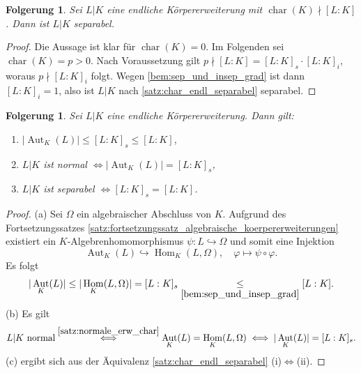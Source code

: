 \documentclass[a4paper, twoside, 11pt, ngerman]{report}
\DeclareMathOperator{\Aut}{Aut}
\DeclareMathOperator{\charact}{char}
\DeclareMathOperator{\Hom}{Hom}
\theoremstyle{definistyle}
\newtheorem{folgerung}[satz]{Folgerung}
\theoremstyle{remark}
\begin{document}
\begin{folgerung}\label{folg:charakteristik_separabel}
Sei $L|K$ eine endliche Körpererweiterung mit $\charact(K) \nmid [L : K]$. Dann ist $L|K$ separabel.
\end{folgerung}
\begin{proof}
Die Aussage ist klar für $\charact(K)=0$. Im Folgenden sei $\charact(K)=p>0$.
Nach Voraussetzung gilt $p \nmid [L : K] = [L : K]_s \cdot [L : K]_i$, woraus $p \nmid [L : K]_i$ folgt.
Wegen \ref{bem:sep_und_insep_grad} ist dann $[L : K]_i = 1$, also ist $L|K$ nach \ref{satz:char_endl_separabel} separabel.
\end{proof}

\begin{folgerung}\label{folg:automorphismen_endlicher_erweiterungen}
Sei $L|K$ eine endliche Körpererweiterung. Dann gilt:
\begin{enumerate}
    \item[(a)] $| \Aut_K(L) | \leq [L : K]_s \leq [L : K]$,
    \item[(b)] $L|K$ ist normal $\iff |\Aut_K(L)| = [L : K]_s$,
    \item[(c)] $L|K$ ist separabel $\iff [L : K]_s = [L : K]$.
\end{enumerate}
\end{folgerung}
\begin{proof}
(a) Sei $\Omega$ ein algebraischer Abschluss von $K$. Aufgrund des Fortsetzungssatzes \ref{satz:fortsetzungssatz_algebraische_koerpererweiterungen} existiert ein $K$-Algebrenhomomorphismus
$\psi\colon L\hookrightarrow\Omega$ und somit eine Injektion
\[
\Aut_K(L) \hookrightarrow \Hom_K(L, \Omega), \quad \varphi\mapsto \psi\circ\varphi.
\]
Es folgt
\[
|\Aut_K(L)| \leq |\Hom_K(L, \Omega)| = [L : K]_s \underset{\ref{bem:sep_und_insep_grad}}{\leq} [L : K].
\]
(b) Es gilt
\[
L|K \text{ normal} \overset{\ref{satz:normale_erw_char}}{\iff} \Aut_K(L) = \Hom_K(L, \Omega) \iff |\Aut_K(L)| = [L : K]_s.
\]    
(c) ergibt sich aus der Äquivalenz \ref{satz:char_endl_separabel} (i)$\Leftrightarrow$(ii).
\end{proof}
\end{document}
